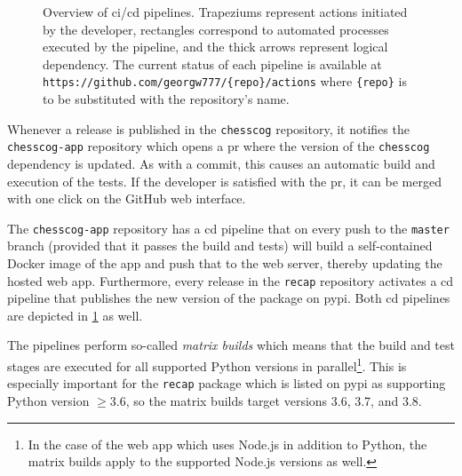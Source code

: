 \documentclass[../main.tex]{subfiles}
\begin{document}
\begin{figure}
{
    }
    \caption[Overview of \acs{ci}/\acs{cd} pipelines.]{Overview of \acs{ci}/\acs{cd} pipelines. Trapeziums represent actions initiated by the developer, rectangles correspond to automated processes executed by the pipeline, and the thick arrows represent logical dependency. The current status of each pipeline is available at \texttt{https://github.com/georgw777/\{repo\}/actions} where \texttt{\{repo\}} is to be substituted with the repository’s name.}
    \label{fig:cicd}
\end{figure}
Whenever a release is published in the \texttt{chesscog} repository, it notifies the \texttt{chesscog-app} repository which opens a \gls{pr} where the version of the \texttt{chesscog} dependency is updated.
As with a commit, this causes an automatic build and execution of the tests.
If the developer is satisfied with the \gls{pr}, it can be merged with one click on the GitHub web interface.

The \texttt{chesscog-app} repository has a \gls{cd} pipeline that on every push to the \texttt{master} branch (provided that it passes the build and tests) will build a self-contained Docker image of the app and push that to the web server, thereby updating the hosted web app.
Furthermore, every release in the \texttt{recap} repository activates a \gls{cd} pipeline that publishes the new version of the package on \gls{pypi}.
Both \gls{cd} pipelines are depicted in \cref{fig:cicd} as well.

The pipelines perform so-called \emph{matrix builds} which means that the build and test stages are executed for all supported Python versions in parallel\footnote{In the case of the web app which uses Node.js in addition to Python, the matrix builds apply to the supported Node.js versions as well.}.
This is especially important for the \texttt{recap} package which is listed on \gls{pypi} as supporting Python version $\geq 3.6$, so the matrix builds target versions 3.6, 3.7, and 3.8.
\end{document}
